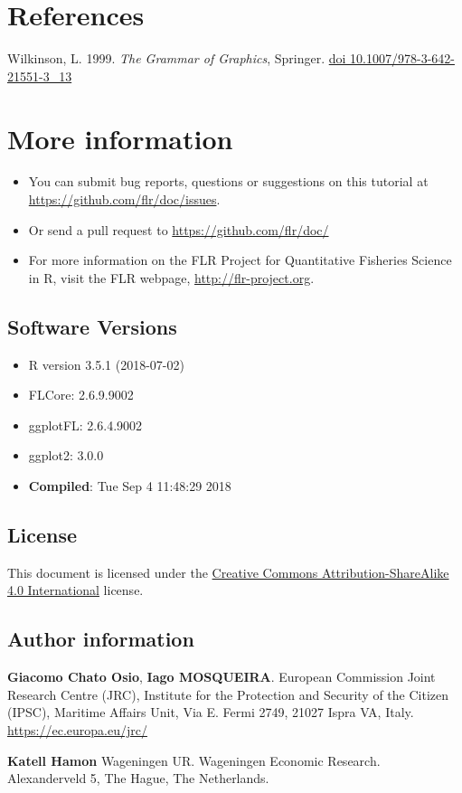 \documentclass[]{article}
\providecommand{\tightlist}{%
  \setlength{\itemsep}{0pt}\setlength{\parskip}{0pt}}
\begin{document}
\section{References}\label{references}

Wilkinson, L. 1999. \emph{The Grammar of Graphics}, Springer.
\href{http://dx.doi.org/10.1007/978-3-642-21551-3_13}{doi
10.1007/978-3-642-21551-3\_13}

\section{More information}\label{more-information}

\begin{itemize}
\tightlist
\item
  You can submit bug reports, questions or suggestions on this tutorial
  at \url{https://github.com/flr/doc/issues}.
\item
  Or send a pull request to \url{https://github.com/flr/doc/}
\item
  For more information on the FLR Project for Quantitative Fisheries
  Science in R, visit the FLR webpage, \url{http://flr-project.org}.
\end{itemize}

\subsection{Software Versions}\label{software-versions}

\begin{itemize}
\tightlist
\item
  R version 3.5.1 (2018-07-02)
\item
  FLCore: 2.6.9.9002
\item
  ggplotFL: 2.6.4.9002
\item
  ggplot2: 3.0.0
\item
  \textbf{Compiled}: Tue Sep 4 11:48:29 2018
\end{itemize}

\subsection{License}\label{license}

This document is licensed under the
\href{https://creativecommons.org/licenses/by-sa/4.0}{Creative Commons
Attribution-ShareAlike 4.0 International} license.

\subsection{Author information}\label{author-information}

\textbf{Giacomo Chato Osio}, \textbf{Iago MOSQUEIRA}. European
Commission Joint Research Centre (JRC), Institute for the Protection and
Security of the Citizen (IPSC), Maritime Affairs Unit, Via E. Fermi
2749, 21027 Ispra VA, Italy. \url{https://ec.europa.eu/jrc/}

\textbf{Katell Hamon} Wageningen UR. Wageningen Economic Research.
Alexanderveld 5, The Hague, The Netherlands.
\end{document}
